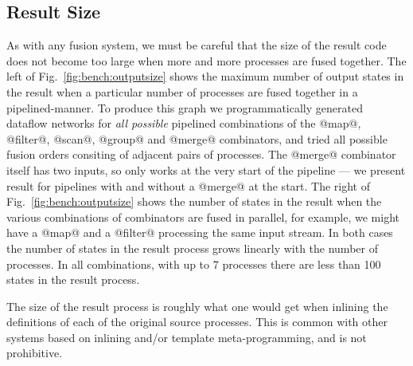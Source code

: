 


\subsection{Result Size}

As with any fusion system, we must be careful that the size of the result code does not become too large when more and more processes are fused together. The left of Fig.~\ref{fig:bench:outputsize} shows the maximum number of output states in the result when a particular number of processes are fused together in a pipelined-manner. To produce this graph we programmatically generated dataflow networks for \emph{all possible} pipelined combinations of the @map@, @filter@, @scan@, @group@ and @merge@ combinators, and tried all possible fusion orders consiting of adjacent pairs of processes. The @merge@ combinator itself has two inputs, so only works at the very start of the pipeline --- we present result for pipelines with and without a @merge@ at the start. The right of Fig.~\ref{fig:bench:outputsize} shows the number of states in the result when the various combinations of combinators are fused in parallel, for example, we might have a @map@ and a @filter@ processing the same input stream. In both cases the number of states in the result process grows linearly with the number of processes. In all combinations, with up to 7 processes there are less than 100 states in the result process. 

The size of the result process is roughly what one would get when inlining the definitions of each of the original source processes. This is common with other systems based on inlining and/or template meta-programming, and is not prohibitive.

